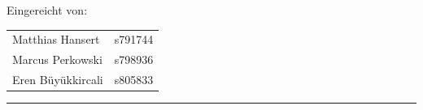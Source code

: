 \begin{titlepage}
\begin{center}
		Eingereicht von: \\
		\begin{tabular}{ll}
			Matthias Hansert & s791744\\
			Marcus Perkowski & s798936\\
			Eren Büyükkircali & s805833\\
		\end{tabular}

	\end{center}
	\vfill
	\textcolor{darkBHT}{\rule{\textwidth}{0.2cm}}
	\vspace{1 cm}
	\normalsize
	
\end{titlepage}

%
%